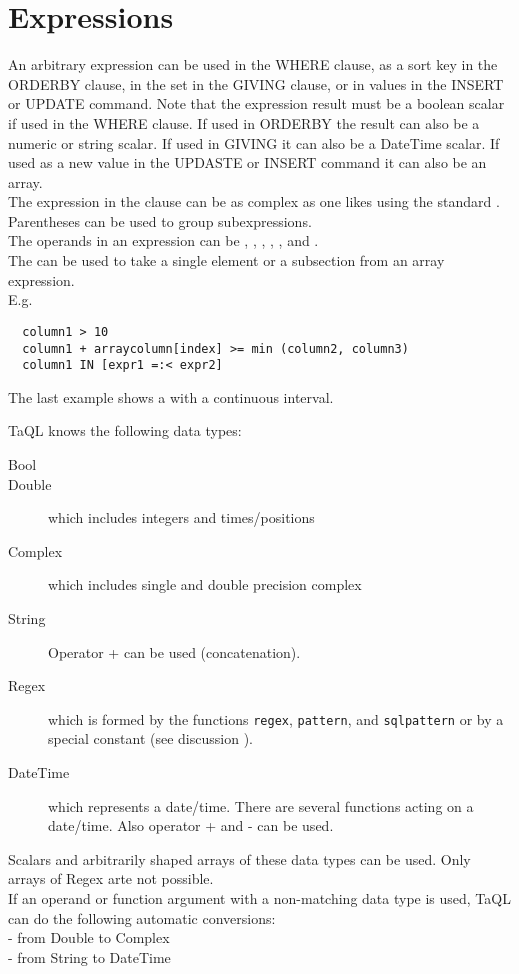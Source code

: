 \section{\label{TAQL:EXPRESSIONS}Expressions}
An arbitrary expression can be used in the WHERE clause, as a sort
key in the ORDERBY clause, in the set in the GIVING clause, or in
values in the INSERT or UPDATE command.
Note that the expression result must be
a boolean scalar if used in the WHERE clause. If used in ORDERBY
the result can also be a numeric or string scalar. If used in 
GIVING it can also be a DateTime scalar. If used as a new value in
the UPDASTE or INSERT command it can also be an array.
\\The expression in the clause can be as complex as one likes
using the standard
.
Parentheses can be used to group subexpressions.
\\The operands in an expression can be
,
,
,
,
, and
.
\\The {} can be used to take a
single element or a subsection from an array expression.
\\E.g.
\begin{verbatim}
  column1 > 10
  column1 + arraycolumn[index] >= min (column2, column3)
  column1 IN [expr1 =:< expr2]
\end{verbatim}
The last example shows a  with a continuous interval.

\label{TAQL:DATATYPES}
TaQL knows the following data types:
\begin{description}
  \item[ Bool]
  \item[ Double] which includes integers and times/positions
  \item[ Complex ] which includes single and double precision complex
  \item[ String ] Operator + can be used (concatenation).
  \item[ Regex ] which is formed by the functions \texttt{regex},
    \texttt{pattern}, and \texttt{sqlpattern} or by a special constant
    (see discussion ).
  \item[ DateTime ] which represents a date/time. There are several functions
       acting on a date/time. Also operator + and - can be used.
\end{description}
Scalars and arbitrarily shaped arrays of these data types can be used.
Only arrays of Regex arte not possible.
\\If an operand or function argument with a non-matching data type
is used, TaQL can do the following automatic conversions:
\\- from Double to Complex
\\- from String to DateTime


